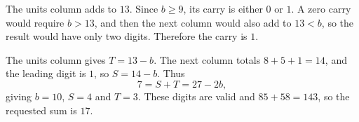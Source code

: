 The units column adds to $13$. Since $b\ge9$, its carry is either $0$ or $1$. A zero carry would require $b>13$, and then the next column would also add to $13<b$, so the result would have only two digits. Therefore the carry is $1$.

The units column gives $T=13-b$. The next column totals $8+5+1=14$, and the leading digit is $1$, so $S=14-b$. Thus
\[
7=S+T=27-2b,
\]
giving $b=10$, $S=4$ and $T=3$. These digits are valid and $85+58=143$, so the requested sum is $\boxed{17}$.
